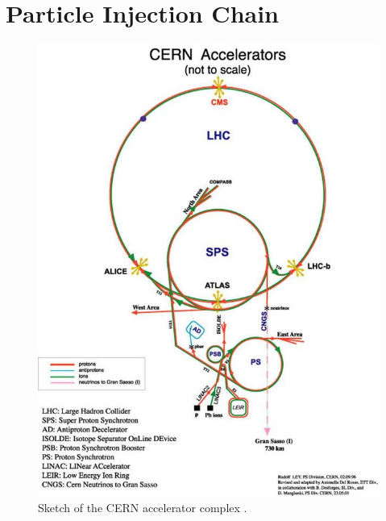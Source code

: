 \section{Particle Injection Chain} \label{sec:lhc:injection}

\begin{figure}[!htbp] 
  \begin{center}
    \includegraphics[width=\linewidth]{figures/lhc/injection.jpg}
    \caption{ Sketch of the  CERN accelerator complex \cite{Servicegraphique:1708849}.} 
    \label{fig:injection_chain} 
  \end{center} 
\end{figure}


